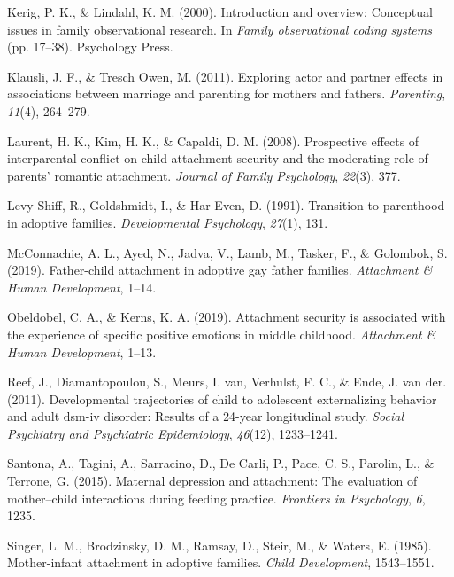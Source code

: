 \documentclass[man]{apa6}
\begin{document}
\leavevmode\hypertarget{ref-kerig2000introduction}{}%
Kerig, P. K., \& Lindahl, K. M. (2000). Introduction and overview: Conceptual issues in family observational research. In \emph{Family observational coding systems} (pp. 17--38). Psychology Press.

\leavevmode\hypertarget{ref-klausli2011exploring}{}%
Klausli, J. F., \& Tresch Owen, M. (2011). Exploring actor and partner effects in associations between marriage and parenting for mothers and fathers. \emph{Parenting}, \emph{11}(4), 264--279.

\leavevmode\hypertarget{ref-laurent2008prospective}{}%
Laurent, H. K., Kim, H. K., \& Capaldi, D. M. (2008). Prospective effects of interparental conflict on child attachment security and the moderating role of parents' romantic attachment. \emph{Journal of Family Psychology}, \emph{22}(3), 377.

\leavevmode\hypertarget{ref-levy1991transition}{}%
Levy-Shiff, R., Goldshmidt, I., \& Har-Even, D. (1991). Transition to parenthood in adoptive families. \emph{Developmental Psychology}, \emph{27}(1), 131.

\leavevmode\hypertarget{ref-mcconnachie2019father}{}%
McConnachie, A. L., Ayed, N., Jadva, V., Lamb, M., Tasker, F., \& Golombok, S. (2019). Father-child attachment in adoptive gay father families. \emph{Attachment \& Human Development}, 1--14.

\leavevmode\hypertarget{ref-obeldobel2019attachment}{}%
Obeldobel, C. A., \& Kerns, K. A. (2019). Attachment security is associated with the experience of specific positive emotions in middle childhood. \emph{Attachment \& Human Development}, 1--13.

\leavevmode\hypertarget{ref-reef2011developmental}{}%
Reef, J., Diamantopoulou, S., Meurs, I. van, Verhulst, F. C., \& Ende, J. van der. (2011). Developmental trajectories of child to adolescent externalizing behavior and adult dsm-iv disorder: Results of a 24-year longitudinal study. \emph{Social Psychiatry and Psychiatric Epidemiology}, \emph{46}(12), 1233--1241.

\leavevmode\hypertarget{ref-santona2015maternal}{}%
Santona, A., Tagini, A., Sarracino, D., De Carli, P., Pace, C. S., Parolin, L., \& Terrone, G. (2015). Maternal depression and attachment: The evaluation of mother--child interactions during feeding practice. \emph{Frontiers in Psychology}, \emph{6}, 1235.

\leavevmode\hypertarget{ref-singer1985mother}{}%
Singer, L. M., Brodzinsky, D. M., Ramsay, D., Steir, M., \& Waters, E. (1985). Mother-infant attachment in adoptive families. \emph{Child Development}, 1543--1551.
\end{document}
